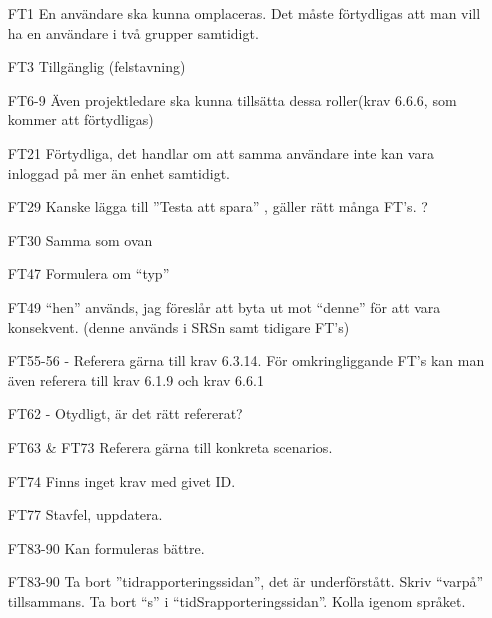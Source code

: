\documentclass[a4paper]{article}
\begin{document}
\begin{itemize}
\begin{itemize}
\item[FT1] En användare ska kunna omplaceras. Det måste förtydligas att man vill ha en användare i två grupper samtidigt.
\item[FT3] Tillgänglig (felstavning)
\item[FT6-9] Även projektledare ska kunna tillsätta dessa roller(krav 6.6.6, som kommer att förtydligas)
\item[FT21] Förtydliga, det handlar om att samma användare inte kan vara inloggad på mer än enhet samtidigt.
\item[FT29] Kanske lägga till ”Testa att spara” , gäller rätt många FT’s. ?
\item[FT30] Samma som ovan
\item[FT47] Formulera om ``typ''
\item[FT49] ``hen'' används, jag föreslår att byta ut mot ``denne'' för att vara konsekvent. (denne används i SRSn samt tidigare FT’s)
\item[FT55-56] - Referera gärna till krav 6.3.14. För omkringliggande FT’s kan man även referera till krav 6.1.9 och krav 6.6.1
\item[FT62] - Otydligt, är det rätt refererat?
\item[FT63 \& FT73] Referera gärna till konkreta scenarios.
\item[FT74] Finns inget krav med givet ID.
\item[FT77] Stavfel, uppdatera.
\item[FT83-90] Kan formuleras bättre.
\item[FT83-90] Ta bort ”tidrapporteringssidan”, det är underförstått. Skriv ``varpå'' tillsammans. Ta bort ``s'' i ``tidSrapporteringssidan''. Kolla igenom språket.
\end{itemize}

\end{itemize}
\end{document}
